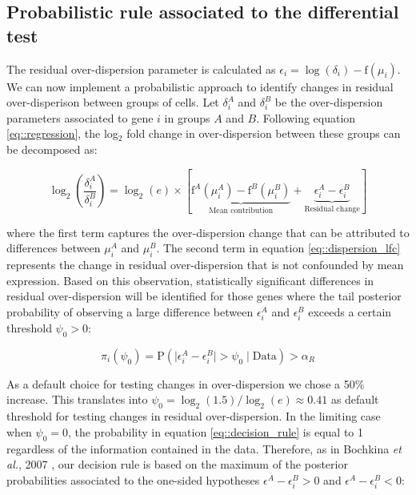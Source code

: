 \newpage

\subsection{Probabilistic rule associated to the differential test} \label{sec:differentialtest}

The residual over-dispersion parameter is calculated as $\epsilon_i=\log(\delta_i)-\text{f}(\mu_i)$. 
We can now implement a probabilistic approach to identify changes in residual over-disperison between groups of cells. 
Let $\delta_i^A$ and $\delta_i^B$ be the over-dispersion parameters associated to gene $i$ in groups $A$ and $B$. 
Following equation \eqref{eq::regression}, the log$_2$ fold change in over-dispersion between these groups can be decomposed as: 

\begin{equation} \label{eq::dispersion_lfc}
\log_2 \left( \frac{\delta_i^A}{\delta_i^B}\right) = \log_2(e) \times \left[\underbrace{\text{f}^A(\mu_i^A) - \text{f}^B(\mu_i^B) }_{\text{Mean contribution}} + \underbrace{\epsilon_i^A - \epsilon_i^B}_{\text{Residual change}} \right]
\end{equation} 

where the first term captures the over-dispersion change that can be attributed to differences between $\mu_i^A$ and $\mu_i^B$. 
The second term in equation \eqref{eq::dispersion_lfc} represents the change in residual over-dispersion that is not confounded by mean expression. 
Based on this observation, statistically significant differences in residual over-dispersion will be identified for those genes where the tail posterior probability of observing a large difference between $\epsilon_i^A$ and $\epsilon_i^B$ exceeds a certain threshold $\psi_0 > 0$:

\begin{equation} \label{eq::decision_rule}
\pi_i(\psi_0)=\text{P}(\mid\epsilon_i^{A}-\epsilon_i^{B}\mid >\psi_0 \mid \text{Data} ) >\alpha_R
\end{equation}
 
As a default choice for testing changes in over-dispersion we chose a 50\% increase. 
This translates into $\psi_0 = \log_2(1.5) / \log_2(e) \approx 0.41$ as default threshold for testing changes in residual over-dispersion. 
In the limiting case when $\psi_0 = 0$, the probability in equation \eqref{eq::decision_rule} is equal to 1 regardless of the information contained in the data. 
Therefore, as in Bochkina \emph{et al.}, 2007 \cite{Bochkina2007}, our decision rule is based on the maximum of the posterior probabilities associated to the one-sided hypotheses $\epsilon^A - \epsilon^B_i > 0$ and  $\epsilon^A - \epsilon^B_i < 0$:

